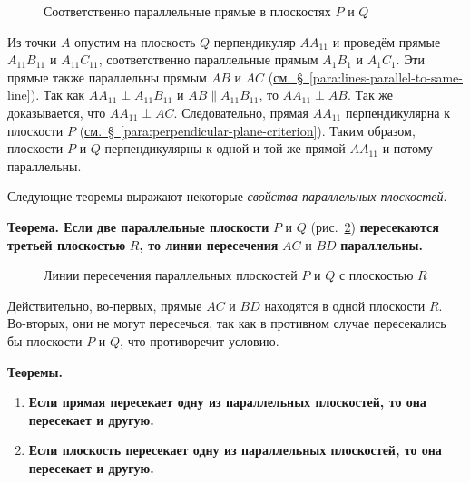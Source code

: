\begin{figure}[htbp]
    \centering
    \renewcommand{\thefigure}{325}
    \captionsetup{name=Рис.,labelsep=period}
    
    \caption{Соответственно параллельные прямые в плоскостях \(P\) и \(Q\)}\label{fig:kiselev-stereo-325}
\end{figure}

Из точки \(A\) опустим на плоскость \(Q\) перпендикуляр \(AA_{11}\) и проведём прямые \(A_{11}B_{11}\) и \(A_{11}C_{11}\), соответственно параллельные прямым \(A_1B_1\) и \(A_1C_1\). Эти прямые также параллельны прямым \(AB\) и \(AC\) (\hyperref[para:lines-parallel-to-same-line]{см.~§~\ref*{para:lines-parallel-to-same-line}}). Так как \(AA_{11}\perp A_{11}B_{11}\) и \(AB\parallel A_{11}B_{11}\), то \(AA_{11}\perp AB\). Так же доказывается, что \(AA_{11}\perp AC\). Следовательно, прямая \(AA_{11}\) перпендикулярна к плоскости \(P\) (\hyperref[para:perpendicular-plane-criterion]{см.~§~\ref*{para:perpendicular-plane-criterion}}). Таким образом, плоскости \(P\) и \(Q\) перпендикулярны к одной и той же прямой \(AA_{11}\) и потому параллельны.

Следующие теоремы выражают некоторые \emph{свойства параллельных плоскостей}.

 \textbf{Теорема. Если две параллельные плоскости} \(P\) и \(Q\) (рис.~\ref{fig:kiselev-stereo-326}) \textbf{пересекаются третьей плоскостью} \(R\)\textbf{, то линии пересечения} \(AC\) и \(BD\) \textbf{параллельны.}

\begin{figure}[htbp]
    \centering
    \renewcommand{\thefigure}{326}
    \captionsetup{name=Рис.,labelsep=period}
    
    \caption{Линии пересечения параллельных плоскостей \(P\) и \(Q\) с плоскостью \(R\)}\label{fig:kiselev-stereo-326}
\end{figure}

Действительно, во-первых, прямые \(AC\) и \(BD\) находятся в одной плоскости \(R\). Во-вторых, они не могут пересечься, так как в противном случае пересекались бы плоскости \(P\) и \(Q\), что противоречит условию.

 \textbf{Теоремы.}

\begin{enumerate}[label=\arabic*),ref=\arabic*]
    \item \textbf{Если прямая пересекает одну из параллельных плоскостей, то она пересекает и другую.}
    \item \textbf{Если плоскость пересекает одну из параллельных плоскостей, то она пересекает и другую.}
\end{enumerate}

